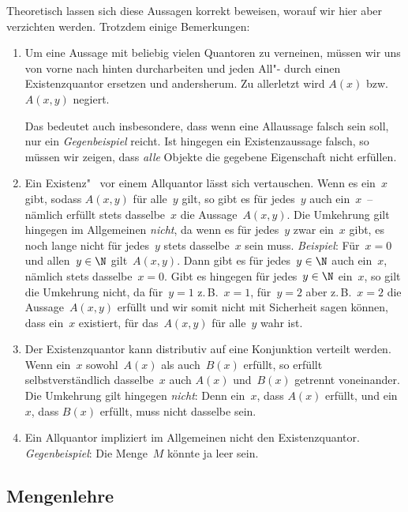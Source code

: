 \documentclass[a4paper]{article}
\begin{document}
\begin{remark}
    Theoretisch lassen sich diese Aussagen korrekt beweisen, worauf wir hier aber verzichten werden. Trotzdem einige Bemerkungen:
    \begin{enumerate}
        \item Um eine Aussage mit beliebig vielen Quantoren zu verneinen, müssen wir uns von vorne nach hinten durcharbeiten und jeden All"- durch einen Existenzquantor ersetzen und andersherum. Zu allerletzt wird $A(x)$ bzw.~$A(x, y)$ negiert.

              Das bedeutet auch insbesondere, dass wenn eine Allaussage falsch sein soll, nur ein \emph{Gegenbeispiel} reicht. Ist hingegen ein Existenzaussage falsch, so müssen wir zeigen, dass \emph{alle} Objekte die gegebene Eigenschaft nicht erfüllen.
        \item Ein Existenz"~ vor einem Allquantor lässt sich vertauschen. Wenn es ein~$x$ gibt, sodass $A(x, y)$ für alle~$y$ gilt, so gibt es für jedes~$y$ auch ein~$x$~-- nämlich erfüllt stets dasselbe~$x$ die Aussage~$A(x, y)$. Die Umkehrung gilt hingegen im Allgemeinen \emph{nicht}, da wenn es für jedes~$y$ zwar ein~$x$ gibt, es noch lange nicht für jedes~$y$ stets dasselbe~$x$ sein muss. \emph{Beispiel}: Für~$x = 0$ und allen~$y \in \N$ gilt~$A(x ,y)$. Dann gibt es für jedes~$y \in \N$ auch ein~$x$, nämlich stets dasselbe~$x = 0$. Gibt es hingegen für jedes~$y \in \N$ ein~$x$, so gilt die Umkehrung nicht, da für~$y = 1$ z.\,B.~$x = 1$, für~$y = 2$ aber z.\,B.~$x = 2$ die Aussage~$A(x, y)$ erfüllt und wir somit nicht mit Sicherheit sagen können, dass ein~$x$ existiert, für das~$A(x, y)$ für alle~$y$ wahr ist.
        \item Der Existenzquantor kann distributiv auf eine Konjunktion verteilt werden. Wenn ein~$x$ sowohl~$A(x)$ als auch~$B(x)$ erfüllt, so erfüllt selbstverständlich dasselbe~$x$ auch $A(x)$ und~$B(x)$ getrennt voneinander. Die Umkehrung gilt hingegen \emph{nicht}: Denn ein~$x$, dass $A(x)$ erfüllt, und ein~$x$, dass $B(x)$ erfüllt, muss nicht dasselbe sein.
        \item Ein Allquantor impliziert im Allgemeinen nicht den Existenzquantor. \emph{Gegenbeispiel}: Die Menge~$M$ könnte ja leer sein.
    \end{enumerate}
\end{remark}

\subsection{Mengenlehre}
\end{document}

